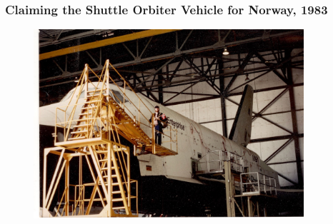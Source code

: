 \documentclass[aspectratio=169,10pt]{beamer} \mode<presentation>
\begin{document}
\begin{frame}
  \frametitle{Claiming the Shuttle Orbiter Vehicle for Norway, 1983}
  \begin{figure}
    \centering
    \includegraphics[width=0.65\linewidth,height=7cm]{Shuttle-1983}
  \end{figure}
\end{frame}



\end{document}
